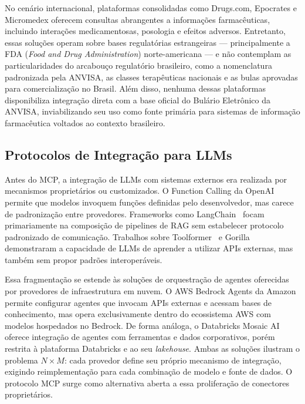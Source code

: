 \documentclass[12pt]{article}
\begin{document}
No cenário internacional, plataformas consolidadas como Drugs.com, Epocrates e Micromedex oferecem consultas abrangentes a informações farmacêuticas, incluindo interações medicamentosas, posologia e efeitos adversos. Entretanto, essas soluções operam sobre bases regulatórias estrangeiras --- principalmente a FDA (\textit{Food and Drug Administration}) norte-americana --- e não contemplam as particularidades do arcabouço regulatório brasileiro, como a nomenclatura padronizada pela ANVISA, as classes terapêuticas nacionais e as bulas aprovadas para comercialização no Brasil. Além disso, nenhuma dessas plataformas disponibiliza integração direta com a base oficial do Bulário Eletrônico da ANVISA, inviabilizando seu uso como fonte primária para sistemas de informação farmacêutica voltados ao contexto brasileiro.

\subsection{Protocolos de Integração para LLMs}

Antes do MCP, a integração de LLMs com sistemas externos era realizada por mecanismos proprietários ou customizados. O Function Calling da OpenAI~\cite{openai2023function} permite que modelos invoquem funções definidas pelo desenvolvedor, mas carece de padronização entre provedores. Frameworks como LangChain~\cite{chase2022langchain} focam primariamente na composição de pipelines de RAG sem estabelecer protocolo padronizado de comunicação. Trabalhos sobre Toolformer~\cite{schick2023toolformer} e Gorilla~\cite{patil2023gorilla} demonstraram a capacidade de LLMs de aprender a utilizar APIs externas, mas também sem propor padrões interoperáveis.

Essa fragmentação se estende às soluções de orquestração de agentes oferecidas por provedores de infraestrutura em nuvem. O AWS Bedrock Agents da Amazon permite configurar agentes que invocam APIs externas e acessam bases de conhecimento, mas opera exclusivamente dentro do ecossistema AWS com modelos hospedados no Bedrock. De forma análoga, o Databricks Mosaic AI oferece integração de agentes com ferramentas e dados corporativos, porém restrita à plataforma Databricks e ao seu \textit{lakehouse}. Ambas as soluções ilustram o problema $N \times M$: cada provedor define seu próprio mecanismo de integração, exigindo reimplementação para cada combinação de modelo e fonte de dados. O protocolo MCP surge como alternativa aberta a essa proliferação de conectores proprietários.
\end{document}
